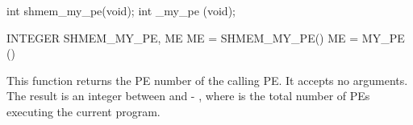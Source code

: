 
\synC
int shmem_my_pe(void);
int _my_pe (void);%

\synF 
INTEGER SHMEM_MY_PE, ME
ME = SHMEM_MY_PE()
ME = MY_PE ()%


{
	This function returns the \ac{PE} number of the calling
  \ac{PE}.   It accepts no arguments.	The result is an integer between  and
   - , where  is the total number of \ac{PE}s executing  the  current
  program.
}
{



}
\eAPI

